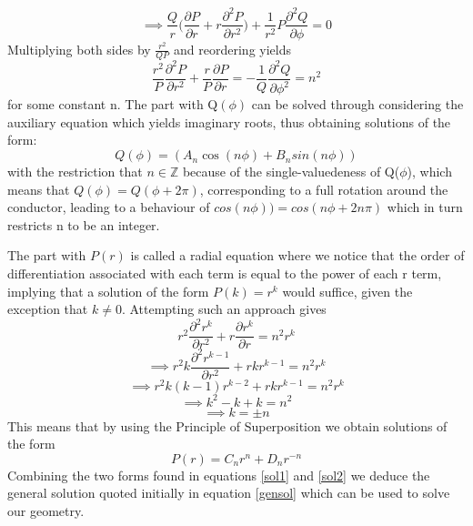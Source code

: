 \documentclass[a4paper]{article}
\begin{document}
\begin{equation}\implies \frac{Q}{r}\bigg(\frac{\partial P}{\partial 
r}+r\frac{\partial^2P}{\partial r^2}\bigg) + 
\frac{1}{r^2}P\frac{\partial^2Q}{\partial \phi} = 0
\end{equation}
Multiplying both sides by $\frac{r^2}{QP}$ and reordering yields
\begin{equation}\frac{r^2}{P} \frac{\partial^2P}{\partial r^2} + \frac{r}{P} 
\frac{\partial P}{\partial r} = - \frac{1}{Q} \frac{\partial^2Q}{\partial 
\phi^2} = n^2 \end{equation}
for some constant n. The part with Q$(\phi)$ can be solved through considering 
the auxiliary equation which yields imaginary roots, thus obtaining solutions 
of the form:
\begin{equation} \label{sol1}
Q(\phi) = (A_n\cos(n\phi)+B_nsin(n\phi))
\end{equation}
with the restriction that $n\in \mathbb{Z}$ because of the single-valuedeness 
of Q($\phi$), which means that $Q(\phi) = Q(\phi+2\pi)$, corresponding to a 
full rotation around the conductor, leading to a behaviour of $cos(n\phi)) = 
cos(n\phi + 2n\pi)$ which in turn restricts n to be an integer.

The part with $P(r)$ is called a radial equation where we notice that the order 
of differentiation associated with each term is equal to the power of each r 
term, implying that a solution of the form $P(k) = r^k$ would suffice, given 
the exception that $k \neq 0$. Attempting such an approach gives
\begin{equation}r^2\frac{\partial^2r^k}{\partial r^2}+r\frac{\partial 
r^k}{\partial r} = n^2r^k \end{equation}
\begin{equation}\implies r^2k\frac{\partial^2r^{k-1}}{\partial r^2}+rkr^{k-1} = 
n^2r^k \end{equation}
\begin{equation}\implies r^2k(k-1)r^{k-2} + rkr^{k-1} = n^2r^k \end{equation}
\begin{equation}\implies k^2 - k + k = n^2\end{equation}
\begin{equation}\implies k = \pm n
\end{equation}
This means that by using the Principle of Superposition we obtain solutions of 
the form 
\begin{equation}\label{sol2}
P(r)=C_nr^n + D_nr^{-n}
\end{equation} 
Combining the two forms found in equations \ref{sol1} and \ref{sol2} we deduce 
the general solution quoted initially in equation \ref{gensol} which can be 
used to solve our geometry.
\end{document}
